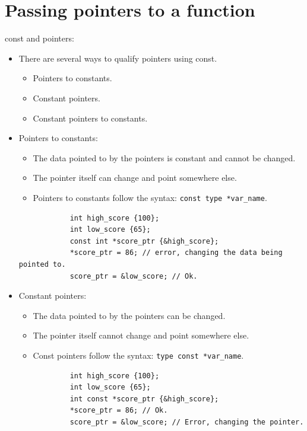 \section{Passing pointers to a function}
const and pointers:
\begin{itemize}
    \item There are several ways to qualify pointers using const.
        \begin{itemize}
            \item Pointers to constants.
            \item Constant pointers.
            \item Constant pointers to constants.
        \end{itemize}
    
    \item Pointers to constants:
        \begin{itemize}
            \item The data pointed to by the pointers is constant and cannot be changed.
            \item The pointer itself can change and point somewhere else.
            \item Pointers to constants follow the syntax: \verb|const type *var_name|.
        \end{itemize}
        \begin{verbatim}
            int high_score {100};
            int low_score {65};
            const int *score_ptr {&high_score};
            *score_ptr = 86; // error, changing the data being pointed to.
            score_ptr = &low_score; // Ok.
        \end{verbatim}
    
    \item Constant pointers:
        \begin{itemize}
            \item The data pointed to by the pointers can be changed.
            \item The pointer itself cannot change and point somewhere else.
            \item Const pointers follow the syntax: \verb|type const *var_name|.
        \end{itemize}
        \begin{verbatim}
            int high_score {100};
            int low_score {65};
            int const *score_ptr {&high_score};
            *score_ptr = 86; // Ok.
            score_ptr = &low_score; // Error, changing the pointer.
        \end{verbatim}
\end{itemize}


